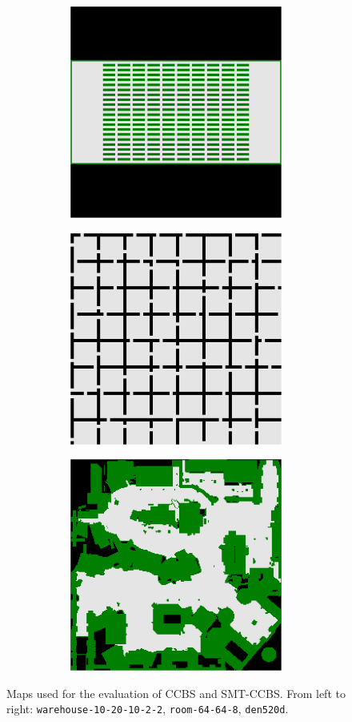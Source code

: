 \documentclass[review]{elsarticle}
\newcommand{\ccbs}{\ac{CCBS}\xspace}
\newcommand{\smtccbs}{SMT-CCBS\xspace}
\begin{document}
\begin{figure}[t]
\centering
\begin{subfigure}
    \centering
    \begin{subfigure}
        \centering
        \includegraphics[width=0.3\linewidth]{gridmap-warehouse-10-20-10-2-2.pdf}
    \end{subfigure}\hspace{0.025\linewidth}%
    \begin{subfigure}
        \centering
        \includegraphics[width=0.3\linewidth]{gridmap-room-64-64-8.pdf}
    \end{subfigure}\hspace{0.025\linewidth}%
    \begin{subfigure}
        \centering
        \includegraphics[width=0.3\linewidth]{gridmap-den520d.pdf}
    \end{subfigure}%
\end{subfigure}
\caption{Maps used for the evaluation of \ccbs and \smtccbs. From left to right: \texttt{warehouse-10-20-10-2-2}, \texttt{room-64-64-8}, \texttt{den520d}.}
\label{fig:gridmaps}
\end{figure}
\end{document}
